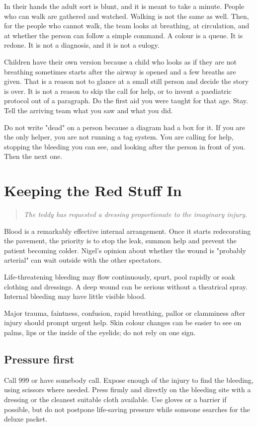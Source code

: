 \documentclass[10pt,openright]{book}
\begin{document}
In their hands the adult sort is blunt, and it is meant to take a minute. People who can walk are gathered and watched. Walking is not the same as well. Then, for the people who cannot walk, the team looks at breathing, at circulation, and at whether the person can follow a simple command. A colour is a queue. It is redone. It is not a diagnosis, and it is not a eulogy.

Children have their own version because a child who looks as if they are not breathing sometimes starts after the airway is opened and a few breaths are given. That is a reason not to glance at a small still person and decide the story is over. It is not a reason to skip the call for help, or to invent a paediatric protocol out of a paragraph. Do the first aid you were taught for that age. Stay. Tell the arriving team what you saw and what you did.

Do not write "dead" on a person because a diagram had a box for it. If you are the only helper, you are not running a tag system. You are calling for help, stopping the bleeding you can see, and looking after the person in front of you. Then the next one.

\chapter{Keeping the Red Stuff In}
\begin{quote}\emph{The teddy has requested a dressing proportionate to the imaginary injury.}\end{quote}
Blood is a remarkably effective internal arrangement. Once it starts redecorating the pavement, the priority is to stop the leak, summon help and prevent the patient becoming colder. Nigel's opinion about whether the wound is "probably arterial" can wait outside with the other spectators.

Life-threatening bleeding may flow continuously, spurt, pool rapidly or soak clothing and dressings. A deep wound can be serious without a theatrical spray. Internal bleeding may have little visible blood.

Major trauma, faintness, confusion, rapid breathing, pallor or clamminess after injury should prompt urgent help. Skin colour changes can be easier to see on palms, lips or the inside of the eyelids; do not rely on one sign.

\section*{Pressure first}
Call 999 or have somebody call. Expose enough of the injury to find the bleeding, using scissors where needed. Press firmly and directly on the bleeding site with a dressing or the cleanest suitable cloth available. Use gloves or a barrier if possible, but do not postpone life-saving pressure while someone searches for the deluxe packet.
\end{document}
